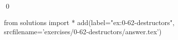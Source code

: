 
\begin{ex}
  \label{ex:0-62-destructors}
  
  \qed
\end{ex}
\begin{python0}
from solutions import *
add(label="ex:0-62-destructors",
    srcfilename='exercises/0-62-destructors/answer.tex')
\end{python0}
